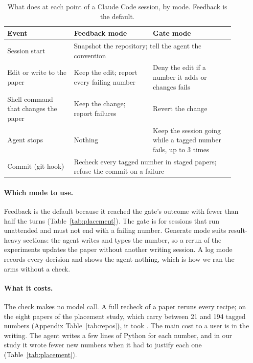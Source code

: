 \begin{table}[t]
  \centering
  \caption{What \tool{} does at each point of a Claude Code session, by mode. Feedback is the default.}
  \label{tab:events}
  \small
  \setlength{\tabcolsep}{5pt}
  \begin{tabular}{@{}p{0.27\linewidth}p{0.32\linewidth}p{0.33\linewidth}@{}}
    \toprule
    \rowcolor{headgray}
    Event & Feedback mode & Gate mode \\
    \midrule
    Session start & \multicolumn{2}{l}{Snapshot the repository; tell the agent the convention} \\
    Edit or write to the paper & Keep the edit; report every failing number & Deny the edit if a number it adds or
    changes fails \\
    Shell command that changes the paper & Keep the change; report failures & Revert the change \\
    Agent stops & Nothing & Keep the session going while a tagged number fails, up to 3 times \\
    Commit (git hook) & \multicolumn{2}{l}{Recheck every tagged number in staged papers; refuse the commit on a failure} \\
    \bottomrule
  \end{tabular}
\end{table}

\paragraph{Which mode to use.}
Feedback is the default because it reached the gate's outcome with fewer than half the turns
(Table~\ref{tab:placement}). The gate is for sessions that run unattended and must not end with a failing number.
Generate mode suits result-heavy sections: the agent writes \valmacro{} and  types the number,
so a rerun of the experiments updates the paper without another writing session. A log mode records every decision
and shows the agent nothing, which is how we ran the arms without a check.

\paragraph{What it costs.}
The check makes no model call. A full recheck of a paper reruns every recipe; on the eight papers of the placement
study, which carry between 21 and 194 tagged numbers (Appendix Table~\ref{tab:repos}), it took \checktime{}. The main cost to a user is in the writing. The
agent writes a few lines of Python for each number, and in our study it wrote fewer new numbers when it had to justify
each one (Table~\ref{tab:placement}).

